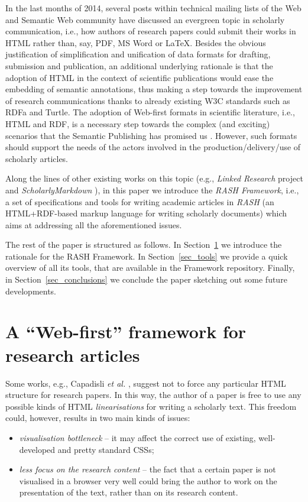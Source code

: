 \documentclass[runningheads,a4paper]{llncs}
\begin{document}
In the last months of 2014, several posts within technical mailing lists of the Web and Semantic Web community have discussed an evergreen topic in scholarly communication, i.e., how authors of research papers could submit their works in HTML rather than, say, PDF, MS Word or LaTeX. Besides the obvious justification of simplification and unification of data formats for drafting, submission and publication, an additional underlying rationale is that the adoption of HTML in the context of scientific publications would ease the embedding of semantic annotations, thus making a step towards the improvement of research communications thanks to already existing W3C standards such as RDFa and Turtle. The adoption of Web-first formats in scientific literature, i.e., HTML and RDF, is a necessary step towards the complex (and exciting) scenarios that the Semantic Publishing has promised us  \cite{force11} \cite{shotton-sempub}. However, such formats should support the needs of the actors involved in the production/delivery/use of scholarly articles.

Along the lines of other existing works on this topic (e.g., {\em Linked Research} project  \cite{linked-research} and {\em ScholarlyMarkdown} \cite{scholmd}), in this paper we introduce the {\em RASH Framework}, i.e., a set of specifications and tools for writing academic articles in {\em RASH} (an HTML+RDF-based markup language for writing scholarly documents) which aims at addressing all the aforementioned issues.

The rest of the paper is structured as follows. In Section~\ref{sec_rationale} we introduce the rationale for the RASH Framework. In Section~\ref{sec_tools} we provide a quick overview of all its tools, that are available in the Framework repository. Finally, in Section~\ref{sec_conclusions} we conclude the paper sketching out some future developments.

\section{A ``Web-first'' framework for research articles}\label{sec_rationale}

Some works, e.g., Capadisli {\em et al.} \cite{linked-research}, suggest not to force any particular HTML structure for research papers. In this way, the author of a paper is free to use any possible kinds of HTML {\em linearisations} for writing a scholarly text. This freedom could, however, results in two main kinds of issues:
\begin{itemize}
\item {\em visualisation bottleneck} -- it may affect the correct use of existing, well-developed and pretty standard CSSs;
\item {\em less focus on the research content} -- the fact that a certain paper is not visualised in a browser very well could bring the author to work on the presentation of the text, rather than on its research content.
\end{itemize}
\end{document}
